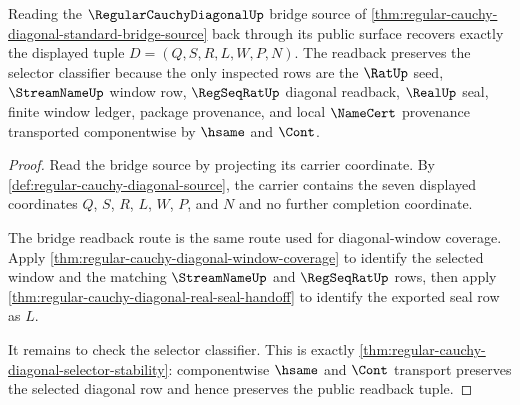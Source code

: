 \begin{theorem}
\label{thm:regular-cauchy-diagonal-bridge-readback-exactness}
Reading the $\RegularCauchyDiagonalUp$ bridge source of \autoref{thm:regular-cauchy-diagonal-standard-bridge-source} back through its public surface recovers exactly the displayed tuple $D=(Q,S,R,L,W,P,N)$. The readback preserves the selector classifier because the only inspected rows are the $\RatUp$ seed, $\StreamNameUp$ window row, $\RegSeqRatUp$ diagonal readback, $\RealUp$ seal, finite window ledger, package provenance, and local $\NameCert$ provenance transported componentwise by $\hsame$ and $\Cont$.
\end{theorem}
\begin{proof}
Read the bridge source by projecting its carrier coordinate. By \autoref{def:regular-cauchy-diagonal-source}, the carrier contains the seven displayed coordinates $Q$, $S$, $R$, $L$, $W$, $P$, and $N$ and no further completion coordinate.

The bridge readback route is the same route used for diagonal-window coverage. Apply \autoref{thm:regular-cauchy-diagonal-window-coverage} to identify the selected window and the matching $\StreamNameUp$ and $\RegSeqRatUp$ rows, then apply \autoref{thm:regular-cauchy-diagonal-real-seal-handoff} to identify the exported seal row as $L$.

It remains to check the selector classifier. This is exactly \autoref{thm:regular-cauchy-diagonal-selector-stability}: componentwise $\hsame$ and $\Cont$ transport preserves the selected diagonal row and hence preserves the public readback tuple.
\end{proof}

